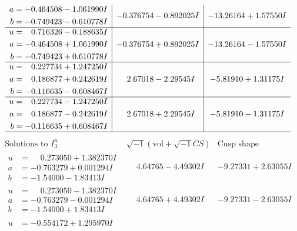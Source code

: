 \documentclass[1p]{elsarticle_modified}
\theoremstyle{definition}
\newcommand{\I}{\sqrt{-1}}
\begin{document}
$$\begin{array}{c|c|c}
\begin{aligned}
a &= -0.464508 - 1.061990 I \\
b &= -0.749423 - 0.610778 I\end{aligned}
 & -0.376754 - 0.892025 I & -13.26164 + 1.57550 I \\ \hline\begin{aligned}
u &= \phantom{-}0.716326 - 0.188635 I \\
a &= -0.464508 + 1.061990 I \\
b &= -0.749423 + 0.610778 I\end{aligned}
 & -0.376754 + 0.892025 I & -13.26164 - 1.57550 I \\ \hline\begin{aligned}
u &= \phantom{-}0.227734 + 1.247250 I \\
a &= \phantom{-}0.186877 + 0.242619 I \\
b &= -0.116635 - 0.608467 I\end{aligned}
 & \phantom{-}2.67018 - 2.29545 I & -5.81910 + 1.31175 I \\ \hline\begin{aligned}
u &= \phantom{-}0.227734 - 1.247250 I \\
a &= \phantom{-}0.186877 - 0.242619 I \\
b &= -0.116635 + 0.608467 I\end{aligned}
 & \phantom{-}2.67018 + 2.29545 I & -5.81910 - 1.31175 I\\
 \hline 
 \end{array}$$\newpage$$\begin{array}{c|c|c}  
\text{Solutions to }I^u_{3}& \I (\text{vol} + \sqrt{-1}CS) & \text{Cusp shape}\\
 \hline 
\begin{aligned}
u &= \phantom{-}0.273050 + 1.382370 I \\
a &= -0.763279 + 0.001294 I \\
b &= -1.54000 - 1.83413 I\end{aligned}
 & \phantom{-}4.64765 - 4.49302 I & -9.27331 + 2.63055 I \\ \hline\begin{aligned}
u &= \phantom{-}0.273050 - 1.382370 I \\
a &= -0.763279 - 0.001294 I \\
b &= -1.54000 + 1.83413 I\end{aligned}
 & \phantom{-}4.64765 + 4.49302 I & -9.27331 - 2.63055 I \\ \hline\begin{aligned}
u &= -0.554172 + 1.295970 I \\

\end{aligned}
\end{array}$$
\end{document}
